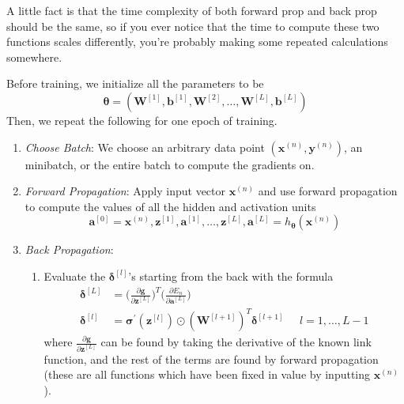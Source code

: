   A little fact is that the time complexity of both forward prop and back prop should be the same, so if you ever notice that the time to compute these two functions scales differently, you're probably making some repeated calculations somewhere. 

  \begin{algo}
    Before training, we initialize all the parameters to be 
    \begin{equation}
      \boldsymbol{\theta} = (\mathbf{W}^{[1]}, \mathbf{b}^{[1]}, \mathbf{W}^{[2]}, \ldots, \mathbf{W}^{[L]}, \mathbf{b}^{[L]})
    \end{equation} 
    Then, we repeat the following for one epoch of training. 
    \begin{enumerate}
      \item \textit{Choose Batch}: We choose an arbitrary data point $(\mathbf{x}^{(n)}, \mathbf{y}^{(n)})$, an minibatch, or the entire batch to compute the gradients on. 
      
      \item \textit{Forward Propagation}: Apply input vector $\mathbf{x}^{(n)}$ and use forward propagation to compute the values of all the hidden and activation units 
      \begin{equation}
        \mathbf{a}^{[0]} = \mathbf{x}^{(n)}, \mathbf{z}^{[1]}, \mathbf{a}^{[1]}, \ldots, \mathbf{z}^{[L]}, \mathbf{a}^{[L]} = h_{\boldsymbol{\theta}} (\mathbf{x}^{(n)})
      \end{equation}
      
      \item \textit{Back Propagation}: 
      \begin{enumerate}
        \item Evaluate the $\boldsymbol{\delta}^{[l]}$'s starting from the back with the formula 
        \begin{align}
          \boldsymbol{\delta}^{[L]} & = \bigg( \frac{\partial \mathbf{g}}{\partial \mathbf{z}^{[L]}} \bigg)^T \bigg( \frac{\partial E_n}{\partial \mathbf{a}^{[L]}} \bigg) \\
          \boldsymbol{\delta}^{[l]} & = \boldsymbol{\sigma}^\prime (\mathbf{z}^{[l]}) \odot (\mathbf{W}^{[l+1]})^T \boldsymbol{\delta}^{[l+1]} \;\;\;\;\; l = 1, \ldots, L-1
        \end{align}
        where $\frac{\partial \mathbf{g}}{\partial \mathbf{z}^{[L]}}$ can be found by taking the derivative of the known link function, and the rest of the terms are found by forward propagation (these are all functions which have been fixed in value by inputting $\mathbf{x}^{(n)}$).  


\end{enumerate}
\end{enumerate}
\end{algo}
